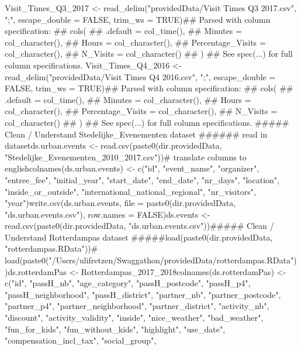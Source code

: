 \documentclass{article}\usepackage[]{graphicx}\usepackage[]{color}
\begin{document}
Visit_Times_Q3_2017 <- read_delim("providedData/Visit Times Q3 2017.csv",
                                  ";", escape_double = FALSE, 
                                  trim_ws = TRUE)## Parsed with column specification:
## cols(
##   .default = col_time(),
##   Minutes = col_character(),
##   Hours = col_character(),
##   Percentage_Visits = col_character(),
##   N_Visits = col_character()
## )
## See spec(...) for full column specifications.
Visit_Times_Q4_2016 <- read_delim("providedData/Visit Times Q4 2016.csv",
                                  ";", escape_double = FALSE, 
                                  trim_ws = TRUE)## Parsed with column specification:
## cols(
##   .default = col_time(),
##   Minutes = col_character(),
##   Hours = col_character(),
##   Percentage_Visits = col_character(),
##   N_Visits = col_character()
## )
## See spec(...) for full column specifications.
##### Clean / Understand Stedelijke_Evenementen dataset ###### read in datasetds.urban.events <- read.csv(paste0(dir.providedData, "Stedelijke_Evenementen_2010_2017.csv"))# translate columns to englishcolnames(ds.urban.events) <- c("id", 
                               "event_name", 
                               "organizer", 
                               "entree_fee", 
                               "initial_year", 
                               "start_date", 
                               "end_date", 
                               "nr_days", 
                               "location", 
                               "inside_or_outside",
                               "international_national_regional", 
                               "nr_visitors",
                               "year")write.csv(ds.urban.events, file = paste0(dir.providedData, "ds.urban.events.csv"), row.names = FALSE)ds.events <- read.csv(paste0(dir.providedData, "ds.urban.events.csv"))##### Clean / Understand Rotterdampas dataset #####load(paste0(dir.providedData, "rotterdampas.RData"))# load(paste0("/Users/ulifretzen/Swaggathon/providedData/rotterdampas.RData"))ds.rotterdamPas <- Rotterdampas_2017_2018colnames(ds.rotterdamPas) <- c("id", "passH_nb", "age_category", "passH_postcode", 
                               "passH_p4", "passH_neighborhood", "passH_district", "partner_nb",
                               "partner_postcode", "partner_p4", "partner_neighborhood", "partner_district",
                               "activity_nb", "discount", "activity_validity", "inside", 
                               "nice_weather", "bad_weather", "fun_for_kids", "fun_without_kids", 
                               "highlight", "use_date", "compensation_incl_tax", "social_group", 
\end{document}
